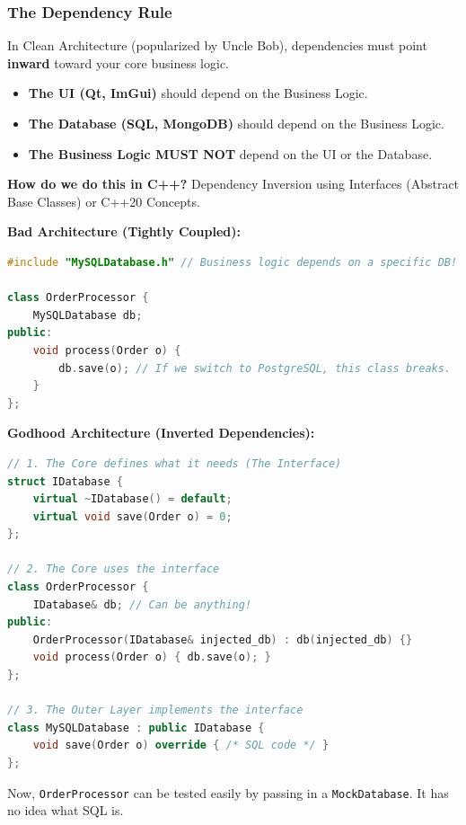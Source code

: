 \hypertarget{the-dependency-rule}{%
\subsubsection{The Dependency Rule}\label{the-dependency-rule}}

In Clean Architecture (popularized by Uncle Bob), dependencies must
point \textbf{inward} toward your core business logic.

\begin{itemize}
\tightlist
\item
  \textbf{The UI (Qt, ImGui)} should depend on the Business Logic.
\item
  \textbf{The Database (SQL, MongoDB)} should depend on the Business
  Logic.
\item
  \textbf{The Business Logic MUST NOT} depend on the UI or the Database.
\end{itemize}

\textbf{How do we do this in C++?} Dependency Inversion using Interfaces
(Abstract Base Classes) or C++20 Concepts.

\textbf{Bad Architecture (Tightly Coupled):}

\begin{lstlisting}[language={C++}]
#include "MySQLDatabase.h" // Business logic depends on a specific DB!

class OrderProcessor {
    MySQLDatabase db;
public:
    void process(Order o) {
        db.save(o); // If we switch to PostgreSQL, this class breaks.
    }
};
\end{lstlisting}

\textbf{Godhood Architecture (Inverted Dependencies):}

\begin{lstlisting}[language={C++}]
// 1. The Core defines what it needs (The Interface)
struct IDatabase {
    virtual ~IDatabase() = default;
    virtual void save(Order o) = 0;
};

// 2. The Core uses the interface
class OrderProcessor {
    IDatabase& db; // Can be anything!
public:
    OrderProcessor(IDatabase& injected_db) : db(injected_db) {}
    void process(Order o) { db.save(o); }
};

// 3. The Outer Layer implements the interface
class MySQLDatabase : public IDatabase {
    void save(Order o) override { /* SQL code */ }
};
\end{lstlisting}

Now, \passthrough{\lstinline!OrderProcessor!} can be tested easily by
passing in a \passthrough{\lstinline!MockDatabase!}. It has no idea what
SQL is.


